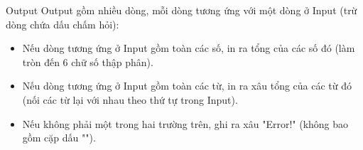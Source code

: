 Output  
Output gồm nhiều dòng, mỗi dòng tương ứng với một dòng ở Input (trừ dòng chứa dấu chấm hỏi):  
\begin{itemize}
	\item     Nếu dòng tương ứng ở Input gồm toàn các số, in ra tổng của các số đó (làm tròn đến 6 chữ số thập phân).   
	\item     Nếu dòng tương ứng ở Input gồm toàn các từ, in ra xâu tổng của các từ đó (nối các từ lại với nhau theo thứ tự trong Input).   
	\item     Nếu không phải một trong hai trường trên, ghi ra xâu "Error!" (không bao gồm cặp dấu "").   
\end{itemize}